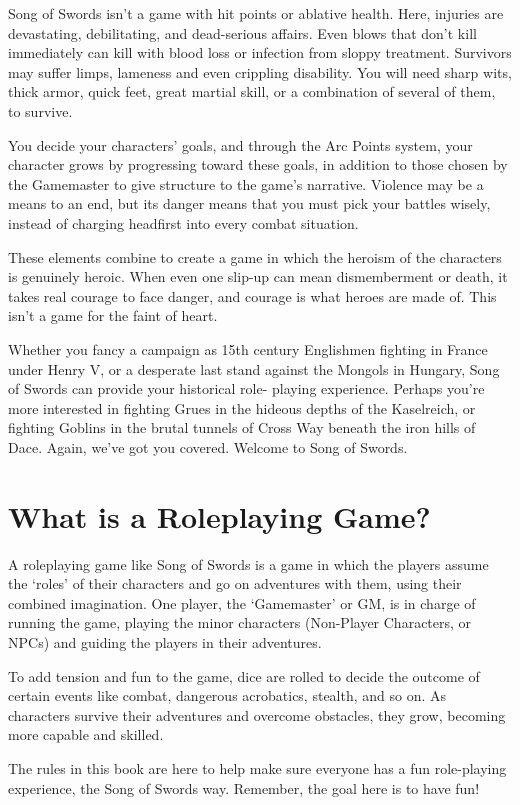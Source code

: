 \documentclass[oneside,11pt,english]{book}
\begin{document}
Song of Swords isn't a game with hit points or ablative health. Here, injuries
are devastating, debilitating, and dead-serious affairs. Even blows that don't
kill immediately can kill with blood loss or infection from sloppy treatment.
Survivors may suffer limps, lameness and even crippling disability. You will
need sharp wits, thick armor, quick feet, great martial skill, or a combination
of several of them, to survive.

You decide your characters' goals, and through the Arc Points system, your
character grows by progressing toward these goals, in addition to those chosen
by the Gamemaster to give structure to the game's narrative. Violence may be a
means to an end, but its danger means that you must pick your battles wisely,
instead of charging headfirst into every combat situation.

These elements combine to create a game in which the heroism of the characters
is genuinely heroic. When even one slip-up can mean dismemberment or death, it
takes real courage to face danger, and courage is what heroes are made of. This
isn't a game for the faint of heart.

Whether you fancy a campaign as 15th century Englishmen fighting in France under
Henry V, or a desperate last stand against the Mongols in Hungary, Song of
Swords can provide your historical role- playing experience. Perhaps you’re more
interested in fighting Grues in the hideous depths of the Kaselreich, or
fighting Goblins in the brutal tunnels of Cross Way beneath the iron hills of
Dace. Again, we’ve got you covered.
Welcome to Song of Swords.

\section{What is a Roleplaying Game?}
A roleplaying game like Song of Swords is a game in which the players assume the
‘roles’ of their characters and go on adventures with them, using their combined
imagination. One player, the ‘Gamemaster’ or GM, is in charge of running the
game, playing the minor characters (Non-Player Characters, or NPCs) and guiding
the players in their adventures.

To add tension and fun to the game, dice are rolled to decide the outcome of
certain events like combat, dangerous acrobatics, stealth, and so on. As
characters survive their adventures and overcome obstacles, they grow, becoming
more capable and skilled.

The rules in this book are here to help make sure everyone has a fun
role-playing experience, the Song of Swords way. Remember, the goal here is to
have fun!
\end{document}
